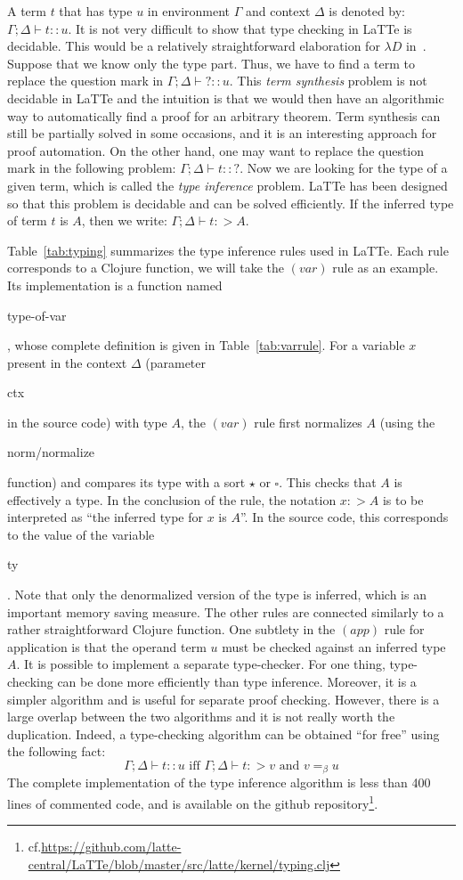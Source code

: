 \documentclass{styles/sig-alternate-05-2015}
\newcommand{\typeterm}{\star}
\newcommand{\kindterm}{\square}
\newcommand{\code}[1]{\begin{sffamily}{\small #1}\end{sffamily}}
\begin{document}
A term $t$ that has type $u$ in environment $\Gamma$ and context
$\Delta$ is denoted by: $\Gamma;\Delta\vdash t :: u$.  It is not very
difficult to show that type checking in LaTTe is decidable. This would
be a relatively straightforward elaboration for $\lambda D$
in~\cite{book:type-theory2014}. Suppose that we know only the type
part. Thus, we have to find a term to replace the question mark in
$\Gamma;\Delta\vdash ? ::u$. This \emph{term synthesis} problem is not
decidable in LaTTe and the intuition is that we would then have an
algorithmic way to automatically find a proof for an arbitrary
theorem. Term synthesis can still be partially solved in some
occasions, and it is an interesting approach for proof automation. On
the other hand, one may want to replace the question mark in the
following problem: $\Gamma;\Delta\vdash t :: ?$. Now we are looking
for the type of a given term, which is called the \emph{type
  inference} problem. LaTTe has been designed so that this problem is
decidable and can be solved efficiently. If the inferred type of term
$t$ is $A$, then we write: $\Gamma;\Delta\vdash t :> A$.

Table~\ref{tab:typing} summarizes the type inference rules used in
LaTTe. Each rule corresponds to a Clojure function, we will take the
$(var)$ rule as an example. Its implementation is a function
named \code{type-of-var}, whose complete definition is given in
Table~\ref{tab:varrule}. For a variable $x$ present in the context
$\Delta$ (parameter \code{ctx} in the source code) with type $A$, the
$(var)$ rule first normalizes $A$ (using the \code{norm/normalize}
function) and compares its type with a sort $\typeterm$ or
$\kindterm$. This checks that $A$ is effectively a type. In the
conclusion of the rule, the notation $x :> A$ is to be interpreted as
``the inferred type for $x$ is $A$''. In the source code, this
corresponds to the value of the variable \code{ty}. Note that only the
denormalized version of the type is inferred, which is an important
memory saving measure. The other rules are connected similarly to a
rather straightforward Clojure function. One subtlety in the $(app)$
rule for application is that the operand term $u$ must be checked
against an inferred type $A$.  It is possible to implement a separate
type-checker. For one thing, type-checking can be done more
efficiently than type inference. Moreover, it is a simpler algorithm
and is useful for separate proof checking. However, there is a large
overlap between the two algorithms and it is not really worth the
duplication. Indeed, a type-checking algorithm can be obtained ``for
free'' using the following fact:
$$\Gamma;\Delta\vdash t::u \text{ iff } \Gamma;\Delta\vdash t :> v
\text{ and } v =_\beta u$$ The complete implementation of the type inference
algorithm is less than 400 lines of commented code,
and is available on the github
repository\footnote{cf.\url{https://github.com/latte-central/LaTTe/blob/master/src/latte/kernel/typing.clj}}.
\end{document}
